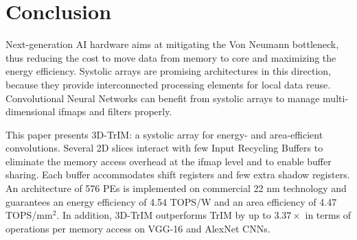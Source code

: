 \section{Conclusion}

Next-generation AI hardware aims at mitigating the Von Neumann bottleneck, thus reducing the cost to move data from memory to core and maximizing the energy efficiency. Systolic arrays are promising architectures in this direction, because they provide interconnected processing elements for local data reuse. Convolutional Neural Networks can benefit from systolic arrays to manage multi-dimensional ifmaps and filters properly.

This paper presents 3D-TrIM: a systolic array for energy- and area-efficient convolutions. Several 2D slices interact with few Input Recycling Buffers to eliminate the memory access overhead at the ifmap level and to enable buffer sharing. Each buffer accommodates shift registers and few extra shadow registers. An architecture of 576 PEs is implemented on commercial 22 nm technology and guarantees an energy efficiency of 4.54 TOPS/W and an area efficiency of 4.47 TOPS/mm$^2$. In addition, 3D-TrIM outperforms TrIM by up to $3.37\times$ in terms of operations per memory access on VGG-16 and AlexNet CNNs.